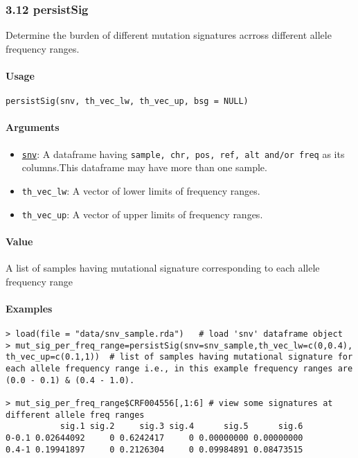 \documentclass[]{article}
\providecommand{\tightlist}{%
  \setlength{\itemsep}{0pt}\setlength{\parskip}{0pt}}
\let\oldparagraph\paragraph
\renewcommand{\paragraph}[1]{\oldparagraph{#1}\mbox{}}
\begin{document}
\subsubsection{3.12 persistSig}\label{persistsig}

Determine the burden of different mutation signatures acrross different
allele frequency ranges.

\paragraph{\texorpdfstring{\textbf{Usage}}{Usage}}\label{usage-11}

\texttt{persistSig(snv,\ th\_vec\_lw,\ th\_vec\_up,\ bsg\ =\ NULL)}

\paragraph{\texorpdfstring{\textbf{Arguments
}}{Arguments }}\label{arguments-10}

\begin{itemize}
\tightlist
\item
  \protect\hyperlink{vcfToSNV}{\texttt{snv}}: A dataframe having
  \texttt{sample,\ chr,\ pos,\ ref,\ alt\ and/or\ freq} as its
  columns.This dataframe may have more than one sample.
\item
  \texttt{th\_vec\_lw}: A vector of lower limits of frequency ranges.
\item
  \texttt{th\_vec\_up}: A vector of upper limits of frequency ranges.
\end{itemize}

\paragraph{\texorpdfstring{\textbf{Value}}{Value}}\label{value-9}

A list of samples having mutational signature corresponding to each
allele frequency range

\paragraph{\texorpdfstring{\textbf{Examples}}{Examples}}\label{examples-11}

\begin{verbatim}
> load(file = "data/snv_sample.rda")   # load 'snv' dataframe object
> mut_sig_per_freq_range=persistSig(snv=snv_sample,th_vec_lw=c(0,0.4), th_vec_up=c(0.1,1))  # list of samples having mutational signature for each allele frequency range i.e., in this example frequency ranges are (0.0 - 0.1) & (0.4 - 1.0).

> mut_sig_per_freq_range$CRF004556[,1:6] # view some signatures at different allele freq ranges
           sig.1 sig.2     sig.3 sig.4      sig.5      sig.6
0-0.1 0.02644092     0 0.6242417     0 0.00000000 0.00000000
0.4-1 0.19941897     0 0.2126304     0 0.09984891 0.08473515
\end{verbatim}
\end{document}
